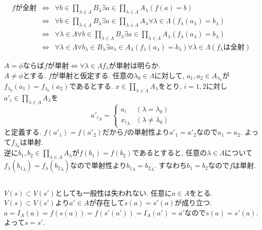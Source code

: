\documentclass{jsarticle}
\begin{document}
\subsection{} %
\begin{eqnarray*}
	fが全射
	&\Leftrightarrow& \forall{b \in \prod_{\lambda \in \Lambda}B_\lambda}\exists{a \in \prod_{\lambda \in \Lambda}A_\lambda}(f(a) = b)\\
	&\Leftrightarrow& \forall{b \in \prod_{\lambda \in \Lambda}B_\lambda}\exists{a \in \prod_{\lambda \in \Lambda}A_\lambda}\forall{\lambda \in \Lambda}(f_\lambda(a_\lambda) = b_\lambda)\\
	&\Leftrightarrow& \forall{\lambda \in \Lambda}\forall{b \in \prod_{\lambda \in \Lambda}B_\lambda}\exists{a \in \prod_{\lambda \in \Lambda}A_\lambda}(f_\lambda(a_\lambda) = b_\lambda)\\
	&\Leftrightarrow& \forall{\lambda \in \Lambda}\forall{b_\lambda \in B_\lambda}\exists{a_\lambda \in A_\lambda}(f_\lambda(a_\lambda) = b_\lambda)
	\forall{\lambda \in \Lambda}(f_\lambda は全射)
\end{eqnarray*}

$A = \phi$ならば$fが単射 \Leftrightarrow \forall{\lambda \in \Lambda}f_\lambda が単射$は明らか.\\
$A \neq \phi$とする. $f$が単射と仮定する. 任意の$\lambda_0 \in \Lambda$に対して, $a_1, a_2 \in A_{\lambda_0}$が$f_{\lambda_0}(a_1) = f_{\lambda_0}(a_2)$であるとする. $x \in \prod_{\lambda \in \Lambda}A_\lambda$をとり, $i = 1, 2$に対し$a'_i \in \prod_{\lambda \in \Lambda}A_\lambda$を
\begin{equation*}
	{a'_i}_{\lambda} =
	\begin{cases}
		a_i & (\lambda = \lambda_0)\\
		{x_i}_{\lambda} & (\lambda \neq \lambda_0)
	\end{cases}
\end{equation*}
と定義する. $f(a'_1) = f(a'_2)$だから$f$の単射性より$a'_1 = a'_2$なので$a_1 = a_2$. よって$f_{\lambda_0}$は単射.\\
逆に$b_1, b_2 \in \prod_{\lambda \in \Lambda}A_\lambda$が$f(b_1) = f(b_2)$であるとすると, 任意の$\lambda \in \Lambda$について$f_\lambda({b_1}_\lambda) = f_\lambda({b_2}_\lambda)$なので単射性より${b_1}_\lambda = {b_2}_\lambda$. すなわち$b_1 = b_2$なので$f$は単射.

\subsection{} %
$V(s) \subset V(s')$としても一般性は失われない. 任意に$a \in A$をとる. $V(s) \subset V(s')$より$a' \in A$が存在して$s(a) = s'(a)$が成り立つ. $a = I_A(a) = f(s(a)) = f(s'(a')) = I_A(a') = a'$なので$s(a) = s'(a)$. よって$s = s'$.
\end{document}
